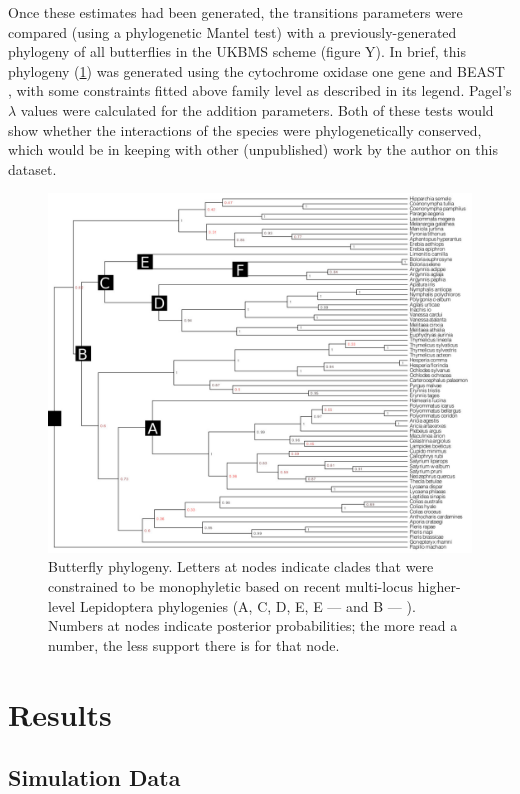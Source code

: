 \documentclass[11pt]{amsart}
\begin{document}
Once these estimates had been generated, the transitions parameters were compared (using a phylogenetic Mantel test) with a previously-generated phylogeny of all butterflies in the UKBMS scheme (figure Y). In brief, this phylogeny (\ref{phylogeny}) was generated using the cytochrome oxidase one gene and BEAST \citep{Drummond2006,Drummond2007,Drummond2012}, with some constraints fitted above family level as described in its legend. Pagel's $\lambda$ values were calculated for the addition parameters. Both of these tests would show whether the interactions of the species were phylogenetically conserved, which would be in keeping with other (unpublished) work by the author on this dataset.
\begin{figure}
\begin{center}
\includegraphics[width=\textwidth]{phylogeny}
\caption[Butterfly phylogeny.]{Butterfly phylogeny. Letters at nodes indicate clades that were constrained to be monophyletic based on recent multi-locus higher-level Lepidoptera phylogenies (A, C, D, E, E --- \citet{Wahlberg2010} and B --- \citet{Mutanen2010}). Numbers at nodes indicate posterior probabilities; the more read a number, the less support there is for that node.}
\label{phylogeny}
\end{center}
\end{figure}
\clearpage
\section{Results}
\subsection{Simulation Data}
\end{document}
